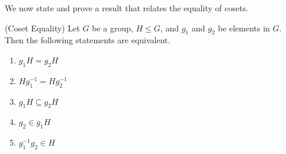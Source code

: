 We now state and prove a result that relates the equality of cosets.
\begin{lemma}\label{lemma-coset-equality}(Coset Equality)
    Let $G$ be a group, $H \leq G$, and $g_1$ and $g_2$ be elements in $G$. Then the following statements are equivalent.
    \begin{enumerate}[label=$(\arabic*)$]
        \item $g_1H = g_2H$
        \item $Hg_1^{-1} = Hg_2^{-1}$
        \item $g_1H \subseteq g_2H$
        \item $g_2 \in g_1H$
        \item $g_1^{-1}g_2 \in H$
    \end{enumerate}
\end{lemma}
